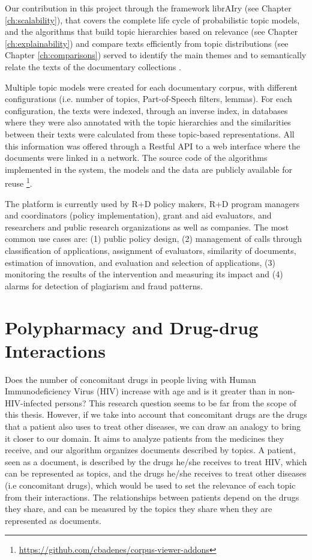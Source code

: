 Our contribution in this project through the framework librAIry (see Chapter \ref{ch:scalability}), that covers the complete life cycle of probabilistic topic models, and the algorithms that build topic hierarchies based on relevance (see Chapter \ref{ch:explainability}) and compare texts efficiently from topic distributions (see Chapter \ref{ch:comparisons}) served to identify the main themes and to semantically relate the texts of the documentary collections \citep{Samy2019}. 

Multiple topic models were created for each documentary corpus, with different configurations (i.e. number of topics, Part-of-Speech filters, lemmas). For each configuration, the texts were indexed, through an inverse index, in databases where they were also annotated with the topic hierarchies and the similarities between their texts were calculated from these topic-based representations. All this information was offered through a Restful API to a web interface where the documents were linked in a network. The source code of the algorithms implemented in the system, the models and the data are publicly available for reuse \footnote{\url{https://github.com/cbadenes/corpus-viewer-addons}}.

The platform is currently used by R+D policy makers, R+D program managers and coordinators (policy implementation), grant and aid evaluators, and researchers and public research organizations as well as companies. The most common use cases are: (1) public policy design, (2) management of calls through classification of applications, assignment of evaluators, similarity of documents, estimation of innovation, and evaluation and selection of applications, (3) monitoring the results of the intervention and measuring its impact and (4) alarms for detection of plagiarism and fraud patterns. 

\section{Polypharmacy and Drug-drug Interactions}
\label{sec:polypharmacy}

Does the number of concomitant drugs in people living with Human Immunodeficiency Virus (HIV) increase with age and is it greater than in non-HIV-infected persons? This research question \citep{Badenes-Olmedo2019c} seems to be far from the scope of this thesis. However, if we take into account that  concomitant drugs are the drugs that a patient also uses to treat other diseases, we can draw an analogy to bring it closer to our domain. It aims to analyze patients from the medicines they receive, and our algorithm organizes documents described by topics. A patient, seen as a document, is described by the drugs he/she receives to treat HIV, which can be represented as topics, and the drugs he/she receives to treat other diseases (i.e concomitant drugs), which would be used to set the relevance of each topic from their interactions. The relationships between patients depend on the drugs they share, and can be measured by the topics they share when they are represented as documents.


